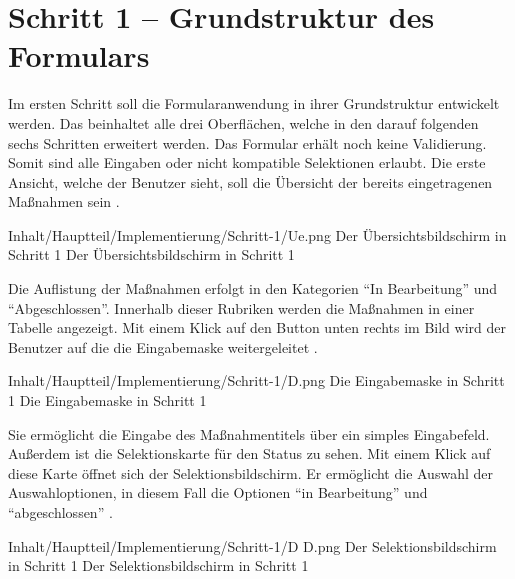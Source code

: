 \chapter{Schritt 1 -- Grundstruktur des Formulars}
\label{chap:Schritt-1}

Im ersten Schritt soll die Formularanwendung in ihrer Grundstruktur entwickelt werden.
 Das beinhaltet alle drei Oberflächen, welche in den darauf folgenden sechs Schritten erweitert werden.
 Das Formular erhält noch keine  Validierung.
 Somit sind alle Eingaben oder nicht kompatible Selektionen erlaubt.
 Die erste Ansicht, welche der Benutzer sieht, soll die Übersicht der bereits eingetragenen Maßnahmen sein \Abb{\ref{fig:Schritt1Uebersicht}}.
 
\begin{alexfigure}{Inhalt/Hauptteil/Implementierung/Schritt-1/Ue.png}
  {Der Übersichtsbildschirm in Schritt 1}
  {Der Übersichtsbildschirm in Schritt 1}

  \label{fig:Schritt1Uebersicht}

\end{alexfigure}

Die Auflistung der Maßnahmen erfolgt in den Kategorien \enquote{In Bearbeitung} und \enquote{Abgeschlossen}.
Innerhalb dieser Rubriken werden die Maßnahmen in einer Tabelle angezeigt.
Mit einem Klick auf den Button unten rechts im Bild wird der Benutzer auf die die Eingabemaske weitergeleitet \Abb{\ref{fig:Schritt1Eingabemaske}}.

\begin{alexfigure}{Inhalt/Hauptteil/Implementierung/Schritt-1/D.png}
  {Die Eingabemaske in Schritt 1}
  {Die Eingabemaske in Schritt 1}

  \label{fig:Schritt1Eingabemaske}

\end{alexfigure}

Sie ermöglicht die Eingabe des Maßnahmentitels über ein simples Eingabefeld.
Außerdem ist die Selektionskarte für den Status zu sehen.
Mit einem Klick auf diese Karte öffnet sich der Selektionsbildschirm.
Er ermöglicht die Auswahl der Auswahloptionen, in diesem Fall die Optionen \enquote{in Bearbeitung} und \enquote{abgeschlossen}
\Abb{\ref{fig:Schritt1SelektionsBildschirmStatus}}.

\begin{alexfigure}{Inhalt/Hauptteil/Implementierung/Schritt-1/D D.png}
  {Der Selektionsbildschirm in Schritt 1}
  {Der Selektionsbildschirm in Schritt 1}

  \label{fig:Schritt1SelektionsBildschirmStatus}

\end{alexfigure}


